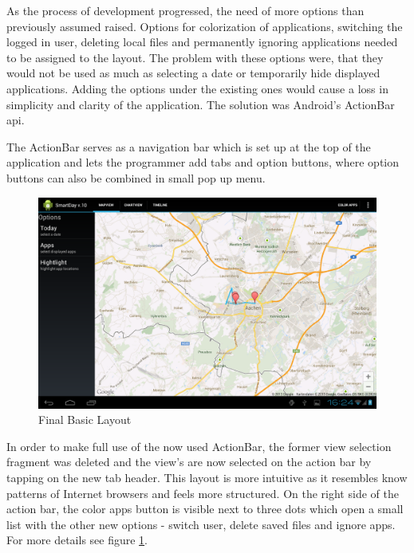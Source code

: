 As  the process of development progressed, the need of more options than previously assumed raised. Options for colorization of applications, switching the logged in user, deleting local files and permanently ignoring applications needed to be assigned to the layout. The problem with these options were, that they would not be used as much as selecting a date or temporarily hide displayed applications. Adding the options under the existing ones would cause a loss in simplicity and clarity of the application. The solution was Android's ActionBar api.

The ActionBar serves as a navigation bar which is set up at the top of the application and lets the programmer add tabs and option buttons, where option buttons can also be combined in small pop up menu. 
\begin{figure}[h]
	\caption{Final Basic Layout}
	\label{img:finalbasiclayout}
	\includegraphics[width=\textwidth]{images/Screenshots/v10/Screenshot_2013-08-19-16-24-58.png}
\end{figure}

In  order to make full use of the now used ActionBar, the former view selection fragment was deleted and the view's are now selected on the action bar by tapping on the new tab header. This layout is more intuitive as it resembles know patterns of Internet browsers and feels more structured. On the right side of the action bar, the color apps button is visible next to three dots which open a small list with the other new options - switch user, delete saved files and ignore apps. For more details see figure \ref{img:finalbasiclayout}.


